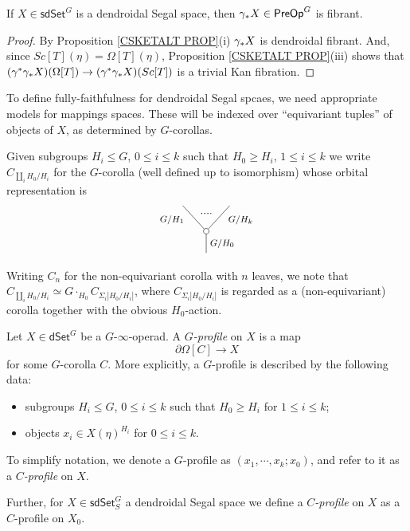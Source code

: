 \documentclass[a4paper,10pt
,draft
]{article}%
\begin{document}
\begin{proposition}
      \label{DSSFIB_PROP}
If $X \in \mathsf{sdSet}^G$ is a dendroidal Segal space, then
$\gamma_{\**}X \in \mathsf{PreOp}^G$ is fibrant.
\end{proposition}

\begin{proof}
	By Proposition \ref{CSKETALT PROP}(i) $\gamma_{\**}X$ is dendroidal fibrant. And, since 
	$Sc[T](\eta)=\Omega[T](\eta)$,
	Proposition \ref{CSKETALT PROP}(iii) shows that 
	$(\gamma^{\**}\gamma_{\**}X)(\Omega[T]) \to 
	(\gamma^{\**} \gamma_{\**}X)(Sc[T])$
	is a trivial Kan fibration.
\end{proof}


To define fully-faithfulness for dendroidal Segal spcaes, we need appropriate models for mappings spaces.
These will be indexed over ``equivariant tuples'' of objects of $X$, as determined by $G$-corollas.

\begin{notation}\label{GCOR NOT}
Given subgroups $H_i \leq G$, $0\leq i \leq k$ such that
$H_0 \geq H_i$, $1 \leq i \leq k$ we write
$C_{\amalg_i H_0/H_i}$ for the $G$-corolla (well defined up to isomorphism)
whose orbital representation is
\[
\begin{tikzpicture}
[grow=up,auto,level distance=2.3em,every node/.style = {font=\footnotesize},dummy/.style={circle,draw,inner sep=0pt,minimum size=1.75mm}]
	\node at (0,0) {}
		child{node [dummy] {}
			child{
			edge from parent node [swap,near end] {$G/H_k$} node [name=Kn] {}}
			child{
			edge from parent node [near end] {$G/H_1$}
node [name=Kone,swap] {}}
		edge from parent node [swap] {$G/H_0$}
		};
		\draw [dotted,thick] (Kone) -- (Kn) ;
\end{tikzpicture}
\]
Writing $C_n$ for the non-equivariant corolla with $n$ leaves, we note that
$C_{\amalg_i H_0/H_i} \simeq 
G \cdot_{H_0} C_{\Sigma_i |H_0/H_i|}$,
where $C_{\Sigma_i |H_0/H_i|}$ is regarded as a (non-equivariant) corolla together with the obvious $H_0$-action.
\end{notation}


\begin{definition}\label{PROF DEF}
	Let $X\in \mathsf{dSet}^G$ be a $G$-$\infty$-operad.
	A \textit{$G$-profile} on $X$ is a map
\[
	\partial \Omega[C] \to X
\]
	for some $G$-corolla $C$. 
	More explicitly, a $G$-profile is described by the following data:
	\begin{itemize}
	\item subgroups $H_i \leq G$, $0\leq i \leq k$ such that
		$H_0 \geq H_i$ for $1 \leq i \leq k$;
	\item objects $x_i \in X(\eta)^{H_i}$ for $0 \leq i \leq k$.
	\end{itemize}
	To simplify notation, we denote a $G$-profile as 
	$(x_1,\cdots,x_k;x_0)$, and refer to it as a 
	\textit{$C$-profile} on $X$.

Further, for $X \in \mathsf{sdSet}^G_S$ a dendroidal Segal space we define a \textit{$C$-profile} on $X$ 
as a $C$-profile on $X_0$.
\end{definition}
\end{document}

